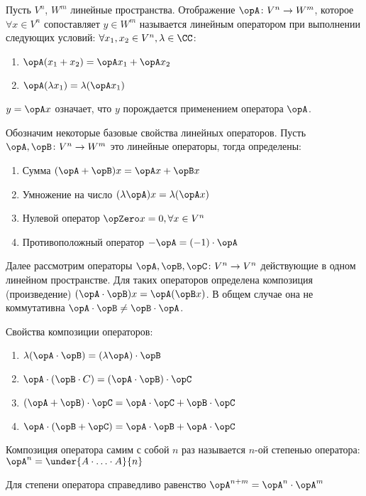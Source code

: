 
\begin{definition}
  Пусть \(V^{n}\), \(W^{m}\) линейные пространства.
  Отображение \(\opA \colon V^{n} \to W^{m}\), которое \(\forall x \in V^{n}\)
  сопоставляет \(y \in W^{m}\) называется линейным оператором при выполнении
  следующих условий: \(\forall x_{1}, x_{2} \in V^{n}, \lambda \in \CC\):

  \begin{enumerate}
    \item \(\opA(x_{1} + x_{2}) = \opA x_{1} + \opA x_{2}\)
    \item \(\opA(\lambda x_{1}) = \lambda (\opA x_{1})\)
  \end{enumerate}
\end{definition}

\begin{remark}
  \(y = \opA x\) означает, что \(y\) порождается применением оператора \(\opA\).
\end{remark}

Обозначим некоторые базовые свойства линейных операторов. Пусть
\(\opA, \opB \colon V^{n} \to W^{m}\) это линейные операторы, тогда определены:
\begin{enumerate}
  \item Сумма \((\opA + \opB) x = \opA x + \opB x\)
  \item Умножение на число \((\lambda \opA) x = \lambda (\opA x)\)
  \item Нулевой оператор \(\opZero x = 0, \forall x \in V^{n}\)
  \item Противоположный оператор \(-\opA = (-1) \cdot \opA\)
\end{enumerate}

Далее рассмотрим операторы \(\opA, \opB, \opC \colon V^{n} \to V^{n}\)
действующие в одном линейном пространстве.
Для таких операторов определена композиция (произведение)
\((\opA \cdot \opB) x = \opA (\opB x)\).
В общем случае она не коммутативна \(\opA \cdot \opB \neq \opB \cdot \opA\).

Свойства композиции операторов:
\begin{multicols}{2}
  \begin{enumerate}
    \item \(\lambda (\opA \cdot \opB) = (\lambda \opA) \cdot \opB\)
    \item \(\opA \cdot (\opB \cdot C) = (\opA \cdot \opB) \cdot \opC\)
    \item \((\opA + \opB) \cdot \opC = \opA \cdot \opC + \opB \cdot \opC\)
    \item \(\opA \cdot (\opB + \opC) = \opA \cdot \opB + \opA \cdot \opC\)
  \end{enumerate}
\end{multicols}

\begin{definition}
  Композиция оператора самим с собой \(n\) раз называется \(n\)-ой степенью
  оператора: \(\opA^{n} = \under{A \cdot \dotsc \cdot A}{n}\)
\end{definition}

\begin{remark}
  Для степени оператора справедливо равенство
  \(\opA^{n + m} = \opA^{n} \cdot \opA^{m}\)
\end{remark}
